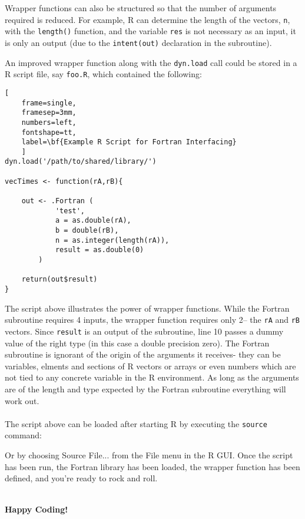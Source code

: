 \documentclass[11pt]{amsart}
\newcommand{\mybox}[1]{\fbox{\begin{minipage}{\textwidth}%
#1
\end{minipage}}}
\begin{document}
\mybox{
{\tt val <- vecTimes(rA,rB,rn)}
}\bigskip

Wrapper functions can also be structured so that the number of arguments required is reduced. For example, R can determine the length of the vectors, {\tt n}, with the {\tt length()} function, and the variable {\tt res} is not necessary as an input, it is only an output (due to the {\tt intent(out)} declaration in the subroutine).\vfill\newpage

An improved wrapper function along with the {\tt dyn.load} call could be stored in a R script file, say {\tt foo.R}, which contained the following:\vskip 0.5cm

\begin{center}
\begin{minipage}{12cm}
\begin{Verbatim}[
    frame=single,
    framesep=3mm,
    numbers=left,
    fontshape=tt,
    label=\bf{Example R Script for Fortran Interfacing}
    ]
dyn.load('/path/to/shared/library/')

vecTimes <- function(rA,rB){

    out <- .Fortran (
            'test',
            a = as.double(rA),
            b = double(rB),
            n = as.integer(length(rA)),
            result = as.double(0)
        )

    return(out$result)
}
\end{Verbatim}
\end{minipage}
\end{center}
\vskip 0.5cm
The script above illustrates the power of wrapper functions. While the Fortran subroutine requires 4 inputs, the wrapper function requires only 2-- the {\tt rA} and {\tt rB} vectors. Since {\tt result} is an output of the subroutine, line 10 passes a dummy value of the right type (in this case a double precision zero). The Fortran subroutine is ignorant of the origin of the arguments it receives- they can be variables, elments and sections of R vectors or arrays or even numbers which are not tied to any concrete variable in the R environment. As long as the arguments are of the length and type expected by the Fortran subroutine everything will work out.
\\\\
The script above can be loaded after starting R by executing the {\tt source} command:\bigskip

\mybox{
{\tt source('/path/to/foo.R')}
}\bigskip

Or by choosing Source File... from the File menu in the R GUI. Once the script has been run, the Fortran library has been loaded, the wrapper function has been defined, and you're ready to rock and roll.
\\\\
\vfill
\begin{center}
\huge\bf Happy Coding!
\end{center}
\end{document}
